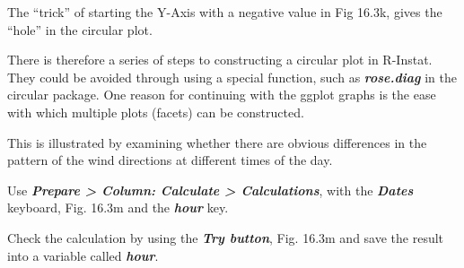 \documentclass[
  letterpaper,
  DIV=11,
  numbers=noendperiod]{scrreprt}
\begin{document}
The ``trick'' of starting the Y-Axis with a negative value in Fig 16.3k,
gives the ``hole'' in the circular plot.

There is therefore a series of steps to constructing a circular plot in
R-Instat. They could be avoided through using a special function, such
as \textbf{\emph{rose.diag}} in the circular package. One reason for
continuing with the ggplot graphs is the ease with which multiple plots
(facets) can be constructed.

This is illustrated by examining whether there are obvious differences
in the pattern of the wind directions at different times of the day.

Use \textbf{\emph{Prepare \textgreater{} Column: Calculate
\textgreater{} Calculations}}, with the \textbf{\emph{Dates}} keyboard,
Fig. 16.3m and the \textbf{\emph{hour}} key.

Check the calculation by using the \textbf{\emph{Try button}}, Fig.
16.3m and save the result into a variable called \textbf{\emph{hour}}.
\end{document}

